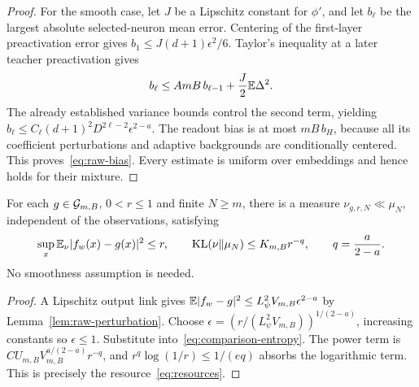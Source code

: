 \begin{proof}
For the smooth case, let $J$ be a Lipschitz constant for $\phi'$, and let $b_\ell$ be the largest absolute selected-neuron mean error. Centering of the first-layer preactivation error gives
$b_1\le J(d+1)\epsilon^2/6$. Taylor's inequality at a later teacher preactivation gives
\[
 b_\ell\le AmB\,b_{\ell-1}+\frac J2\mathbb E\Delta^2.
\]
The already established variance bounds control the second term, yielding
$b_\ell\le C_\ell(d+1)^2D^{2\ell-2}\epsilon^{2-a}$.
The readout bias is at most $mB\,b_H$, because all its coefficient perturbations and adaptive backgrounds are conditionally centered. This proves~\eqref{eq:raw-bias}. Every estimate is uniform over embeddings and hence holds for their mixture.
\end{proof}

\begin{lemma}\label{lem:l2-comparison}
For each $g\in\mathcal G_{m,B}$, $0<r\le1$ and finite $N\ge m$, there is a measure $\nu_{g,r,N}\ll\mu_N$, independent of the observations, satisfying
\begin{equation}
 \sup_x\mathbb E_\nu|f_w(x)-g(x)|^2\le r,\qquad
 \operatorname{KL}(\nu\|\mu_N)\le K_{m,B}r^{-q},
 \qquad q=\frac a{2-a}.
 \label{eq:l2-comparison}
\end{equation}
No smoothness assumption is needed.
\end{lemma}
\begin{proof}
A Lipschitz output link gives $\mathbb E|f_w-g|^2\le L_\psi^2V_{m,B}\epsilon^{2-a}$ by Lemma~\ref{lem:raw-perturbation}. Choose $\epsilon=(r/(L_\psi^2V_{m,B}))^{1/(2-a)}$, increasing constants so $\epsilon\le1$. Substitute into~\eqref{eq:comparison-entropy}. The power term is $C U_{m,B}V_{m,B}^{a/(2-a)}r^{-q}$, and $r^q\log(1/r)\le1/(eq)$ absorbs the logarithmic term. This is precisely the resource~\eqref{eq:resources}.
\end{proof}

